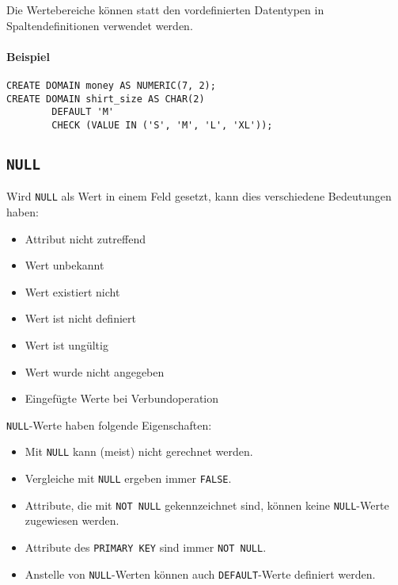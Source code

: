            Die Wertebereiche können statt den vordefinierten Datentypen in Spaltendefinitionen verwendet werden.
            
            \paragraph{Beispiel}
            	\begin{lstlisting}
CREATE DOMAIN money AS NUMERIC(7, 2);
CREATE DOMAIN shirt_size AS CHAR(2)
		DEFAULT 'M'
		CHECK (VALUE IN ('S', 'M', 'L', 'XL'));
            	\end{lstlisting}

        \subsection{\lstinline|NULL|} %
        	Wird \lstinline|NULL| als Wert in einem Feld gesetzt, kann dies verschiedene Bedeutungen haben:
        	\begin{itemize}
        		\item Attribut nicht zutreffend
        		\item Wert unbekannt
        		\item Wert existiert nicht
        		\item Wert ist nicht definiert
        		\item Wert ist ungültig
        		\item Wert wurde nicht angegeben
        		\item Eingefügte Werte bei Verbundoperation
        	\end{itemize}
        	
        	\lstinline|NULL|-Werte haben folgende Eigenschaften:
        	\begin{itemize}
        		\item Mit \lstinline|NULL| kann (meist) nicht gerechnet werden.
        		\item Vergleiche mit \lstinline|NULL| ergeben immer \lstinline|FALSE|.
        		\item Attribute, die mit \lstinline|NOT NULL| gekennzeichnet sind, können keine \lstinline|NULL|-Werte zugewiesen werden.
        		\item Attribute des \lstinline|PRIMARY KEY| sind immer \lstinline|NOT NULL|.
        		\item Anstelle von \lstinline|NULL|-Werten können auch \lstinline|DEFAULT|-Werte definiert werden.
        	\end{itemize}


